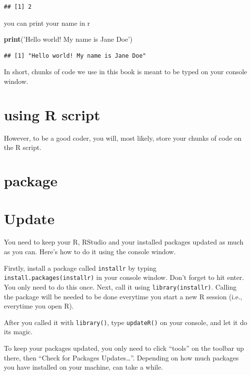 \documentclass[
]{book}
\newenvironment{Shaded}{\begin{snugshade}}{\end{snugshade}}
\newcommand{\KeywordTok}[1]{\textcolor[rgb]{0.13,0.29,0.53}{\textbf{#1}}}
\newcommand{\NormalTok}[1]{#1}
\newcommand{\StringTok}[1]{\textcolor[rgb]{0.31,0.60,0.02}{#1}}
\begin{document}
\begin{verbatim}
## [1] 2
\end{verbatim}

you can print your name in r

\begin{Shaded}
\begin{Highlighting}[]
\KeywordTok{print}\NormalTok{(}\StringTok{'Hello world! My name is Jane Doe'}\NormalTok{)}
\end{Highlighting}
\end{Shaded}

\begin{verbatim}
## [1] "Hello world! My name is Jane Doe"
\end{verbatim}

In short, chunks of code we use in this book is meant to be typed on your console window.

\hypertarget{using-r-script}{%
\section{using R script}\label{using-r-script}}

However, to be a good coder, you will, most likely, store your chunks of code on the R script.

\hypertarget{package}{%
\section{package}\label{package}}

\hypertarget{update}{%
\section{Update}\label{update}}

You need to keep your R, RStudio and your installed packages updated as much as you can. Here's how to do it using the console window.

Firstly, install a package called \texttt{installr} by typing \texttt{install.packages(\textquotesingle{}installr\textquotesingle{})} in your console window. Don't forget to hit enter. You only need to do this once. Next, call it using \texttt{library(installr)}. Calling the package will be needed to be done everytime you start a new R session (i.e., everytime you open R).

After you called it with \texttt{library()}, type \texttt{updateR()} on your console, and let it do its magic.

To keep your packages updated, you only need to click ``tools'' on the toolbar up there, then ``Check for Packages Updates\ldots{}''. Depending on how much packages you have installed on your machine, can take a while.
\end{document}
